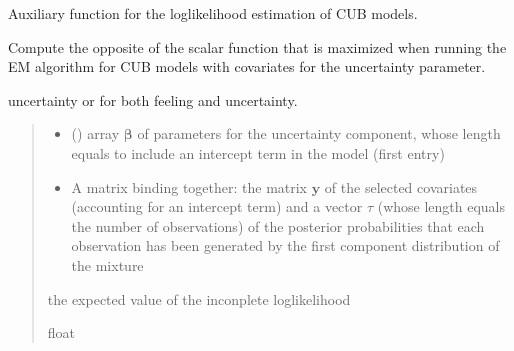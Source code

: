 \documentclass[letterpaper,10pt,english]{sphinxmanual}
\begin{document}

\begin{fulllineitems}
\label{\detokenize{cubmods:cubmods.cub_y0.effe10}}
\pysigstartsignatures
{}
\pysigstopsignatures
\sphinxAtStartPar
Auxiliary function for the log\sphinxhyphen{}likelihood estimation of CUB models.

\sphinxAtStartPar
Compute the opposite of the scalar function that is maximized when running
the E\sphinxhyphen{}M algorithm for CUB models with covariates for the uncertainty parameter.
\begin{description}
\sphinxAtStartPar
uncertainty or for both feeling and uncertainty.

\end{description}
\begin{quote}\begin{description}
\begin{itemize}
\item {} 
\sphinxAtStartPar
{} () \textendash{} array \(\pmb \beta\) of parameters for the uncertainty component, whose length equals 
 to include an intercept term in the model (first entry)

\item {} 
\sphinxAtStartPar
{} \textendash{} A matrix binding together: the matrix \(\pmb y\) of the selected covariates  
(accounting for an intercept term) and a vector \(\tau\) (whose length equals the number of observations) 
of the posterior probabilities that each observation has been generated by the first component 
distribution of the mixture

\end{itemize}

\sphinxAtStartPar
the expected value of the inconplete log\sphinxhyphen{}likelihood

\sphinxAtStartPar
float

\end{description}\end{quote}

\end{fulllineitems}
\end{document}
